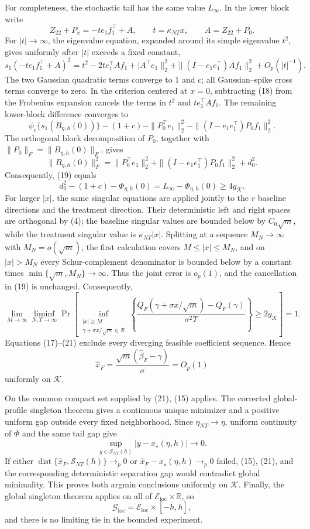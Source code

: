 For completeness, the stochastic tail has the same value \(L_\infty\).  In the lower block write
\[
 Z_{22}+P_x=-t e_1f_1^{\top}+A,
 \qquad t=\kappa_{NT}x,
 \qquad A=Z_{22}+P_0.
\]
For \(|t|\to\infty\), the eigenvalue equation, expanded around its simple eigenvalue \(t^2\), gives uniformly after \(|t|\) exceeds a fixed constant,
\[
 s_1(-t e_1f_1^{\top}+A)^2
 =t^2-2t e_1^{\top}Af_1+|A^{\top}e_1\|_2^2
 +\|(I-e_1e_1^{\top})Af_1\|_2^2+O_p(|t|^{-1}). \tag{18}
\]
The two Gaussian quadratic terms converge to \(1\) and \(c\); all Gaussian--spike cross terms converge to zero.  In the criterion centered at \(x=0\), subtracting (18) from the Frobenius expansion cancels the terms in \(t^2\) and \(t e_1^{\top}Af_1\).  The remaining lower-block difference converges to
\[
 \psi_c\{s_1(B_{\eta,h}(0))\}-(1+c)
 -\|P_0^{\top}e_1\|_2^2
 -\|(I-e_1e_1^{\top})P_0f_1\|_2^2. \tag{19}
\]
The orthogonal block decomposition of \(P_0\), together with \(\|P_0\|_F=\|B_{\eta,h}(0)\|_F\), gives
\[
 \|B_{\eta,h}(0)\|_F^2
 =\|P_0^{\top}e_1\|_2^2
 +\|(I-e_1e_1^{\top})P_0f_1\|_2^2+d_0^2.
\]
Consequently, (19) equals
\[
 d_0^2-(1+c)-\Phi_{\eta,h}(0)
 =L_\infty-\Phi_{\eta,h}(0)\geq4g_{\mathcal K}. \tag{20}
\]
For larger \(|x|\), the same singular equations are applied jointly to the \(r\) baseline directions and the treatment direction.  Their deterministic left and right spaces are orthogonal by (4); the baseline singular values are bounded below by \(C_0\sqrt m\), while the treatment singular value is \(\kappa_{NT}|x|\).  Splitting at a sequence \(M_N\to\infty\) with \(M_N=o(\sqrt m)\), the first calculation covers \(M\leq|x|\leq M_N\), and on \(|x|>M_N\) every Schur-complement denominator is bounded below by a constant times \(\min\{\sqrt m,M_N\}\to\infty\).  Thus the joint error is \(o_p(1)\), and the cancellation in (19) is unchanged.  Consequently,
\[
 \lim_{M\to\infty}\liminf_{N,T\to\infty}
 \Pr\!\left[
 \inf_{\substack{|x|\geq M\\ \gamma+\sigma x/\sqrt m\in\mathcal B}}
 \left\{
 \frac{Q_F(\gamma+\sigma x/\sqrt m)-Q_F(\gamma)}{\sigma^2T}
 \right\}\geq2g_{\mathcal K}
 \right]=1. \tag{21}
\]
Equations (17)--(21) exclude every diverging feasible coefficient sequence.  Hence
\[
 \widehat x_F=\frac{\sqrt m(\widehat\beta_F-\gamma)}\sigma=O_p(1) \tag{22}
\]
uniformly on \(\mathcal K\).

On the common compact set supplied by (21), (15) applies.  The corrected global-profile singleton theorem gives a continuous unique minimizer and a positive uniform gap outside every fixed neighborhood.  Since \(\eta_{NT}\to\eta\), uniform continuity of \(\Phi\) and the same tail gap give
\[
 \sup_{y\in\mathcal S_{NT}(h)}|y-x_\star(\eta,h)|\longrightarrow0. \tag{23}
\]
If either \(\operatorname{dist}\{\widehat x_F,\mathcal S_{NT}(h)\}\to_p0\) or \(\widehat x_F-x_\star(\eta,h)\to_p0\) failed, (15), (21), and the corresponding deterministic separation gap would contradict global minimality.  This proves both argmin conclusions uniformly on \(\mathcal K\).  Finally, the global singleton theorem applies on all of \(\mathcal E_{\mathrm{loc}}\times\mathbb R\), so
\[
 \mathcal G_{\mathrm{loc}}=
 \mathcal E_{\mathrm{loc}}\times[-\overline h,\overline h],
\]
and there is no limiting tie in the bounded experiment.

